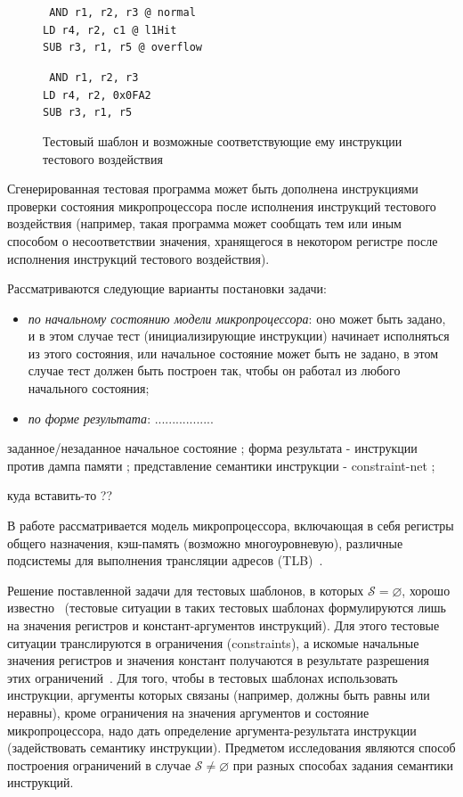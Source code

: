 \begin{figure}[h]
\quad\parbox{0.5\textwidth}{\small \tt
AND r1, r2, r3 @ normal\\
LD r4, r2, c1 @ l1Hit\\
SUB r3, r1, r5 @ overflow } \parbox{0.3\textwidth}{\small \tt
AND r1, r2, r3\\
LD r4, r2, 0x0FA2\\
SUB r3, r1, r5
}
\caption{Тестовый шаблон и возможные соответствующие ему инструкции
тестового воздействия}\label{test_template_exmp}
\end{figure}

Сгенерированная тестовая программа может быть дополнена
инструкциями проверки состояния микропроцессора после исполнения
инструкций тестового воздействия (например, такая программа может сообщать тем или иным способом о несоответствии значения, хранящегося в некотором регистре после исполнения инструкций тестового воздействия).

Рассматриваются следующие варианты постановки задачи:
\begin{itemize}
  \item \emph{по начальному состоянию модели микропроцессора}: оно может быть задано, и в этом случае тест (инициализирующие инструкции) начинает исполняться из этого состояния, или начальное состояние может быть не задано, в этом случае тест должен быть построен так, чтобы он работал из любого начального состояния;
  \item \emph{по форме результата}:  .................
\end{itemize}
заданное/незаданное начальное состояние ;
форма результата - инструкции против дампа памяти ;
представление семантики инструкции - constraint-net ;

\cite{my_isp_2009, my_programmirovanie_2009} куда вставить-то ??


В работе рассматривается модель
микропроцессора, включающая в себя регистры общего назначения,
кэш-память (возможно многоуровневую), различные подсистемы для выполнения
трансляции адресов (TLB)~\cite{HennesyPatterson}.

Решение поставленной задачи для тестовых шаблонов, в которых
$\mathcal{S} = \varnothing$, хорошо известно~\cite{my_syrcose_2008,
my_isp_2008} (тестовые ситуации в таких тестовых шаблонах
формулируются лишь на значения регистров и констант-аргументов
инструкций). Для этого тестовые ситуации транслируются в ограничения
(constraints), а искомые начальные значения регистров и значения
констант получаются в результате разрешения этих
ограничений~\cite{CSP}. Для того, чтобы в тестовых шаблонах
использовать инструкции, аргументы которых связаны (например, должны
быть равны или неравны), кроме ограничения на значения аргументов и
состояние микропроцессора, надо дать определение
аргумента-результата инструкции (задействовать семантику
инструкции). Предметом исследования являются способ построения
ограничений в случае $\mathcal{S} \neq \varnothing$ при разных
способах задания семантики инструкций.


